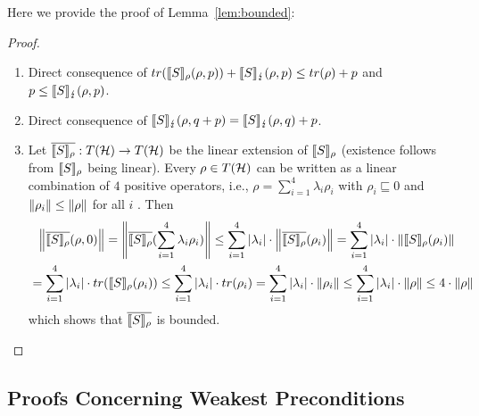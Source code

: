 \documentclass[a4paper,UKenglish,cleveref, autoref, thm-restate]{lipics-v2021}
\begin{document}
Here we provide the proof of Lemma~\ref{lem:bounded}:
\begin{proof}
    \begin{enumerate}
        \item Direct consequence of $tr(\llbracket S \rrbracket_{\rho}(\rho,p))+ \llbracket S \rrbracket_{\lightning} (\rho ,p)\leq tr(\rho)+p$ and $p \leq\llbracket S \rrbracket_{\lightning}(\rho,p)$.
        \item Direct consequence of $\llbracket S \rrbracket_{\lightning}(\rho,q+p) = \llbracket S \rrbracket_{\lightning}(\rho,q) + p$.
        \item Let $\overline{\llbracket S \rrbracket_{\rho}}: T(\mathcal{H}) \to T(\mathcal{H})$ be the linear extension of $\llbracket S \rrbracket_{\rho}$ (existence follows from $\llbracket S \rrbracket_{\rho}$ being linear).
        Every $\rho\in T(\mathcal{H})$ can be written as a linear combination of $4$ positive operators, i.e., $\rho= \sum_{i=1}^4 \lambda_i \rho_i$ with $\rho_i \sqsubseteq 0$ and $\norm{\rho_i}\leq \norm{\rho}$ for all $i$ \cite[]{isabelleproof}. Then
        \begin{align*}
            &\phantom{=}\norm{\overline{\llbracket S \rrbracket_{\rho}}(\rho,0)} = \norm{\overline{\llbracket S \rrbracket_{\rho}}(\sum_{i=1}^4 \lambda_i \rho_i)} \leq \sum_{i=1}^4 \abs{\lambda_i}\cdot \norm{ \overline{\llbracket S \rrbracket_{\rho}}(\rho_i)} =\sum_{i=1}^4 \abs{\lambda_i}\cdot \norm{ \llbracket S \rrbracket_{\rho}(\rho_i)} \\
            &= \sum_{i=1}^4 \abs{\lambda_i}\cdot tr( \llbracket S \rrbracket_{\rho}(\rho_i)) \leq \sum_{i=1}^4 \abs{\lambda_i}\cdot tr( \rho_i) = \sum_{i=1}^4 \abs{\lambda_i}\cdot \norm{ \rho_i}\leq \sum_{i=1}^4 \abs{\lambda_i}\cdot \norm{ \rho} \leq 4 \cdot \norm{ \rho}
        \end{align*} which shows that $\overline{\llbracket S \rrbracket_{\rho}}$ is bounded.
    \end{enumerate}
\end{proof}

\subsection{Proofs Concerning Weakest Preconditions}
\label{app:wp}
\end{document}
